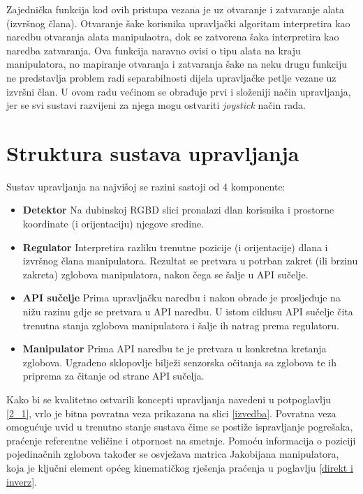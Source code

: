 \documentclass[times, utf8, diplomski, numeric]{fer}
\begin{document}
Zajednička funkcija kod ovih pristupa vezana je uz otvaranje i zatvaranje alata (izvršnog člana).
Otvaranje šake korisnika upravljački algoritam interpretira kao naredbu otvaranja alata manipulaotra, dok se zatvorena šaka interpretira kao naredba zatvaranja.
Ova funkcija naravno ovisi o tipu alata na kraju manipulatora, no mapiranje otvaranja i zatvaranja šake na neku drugu funkciju ne predstavlja problem radi separabilnosti dijela upravljačke petlje vezane uz izvršni član.
U ovom radu većinom se obrađuje prvi i složeniji način upravljanja, jer se svi sustavi razvijeni za njega mogu ostvariti \textit{joystick} način rada.



\section{Struktura sustava upravljanja}
Sustav upravljanja na najvišoj se razini sastoji od 4 komponente:
\begin{itemize}
  \item \textbf{Detektor} Na dubinskoj RGBD slici pronalazi dlan korisnika i prostorne koordinate (i orijentaciju) njegove sredine. 
  \item \textbf{Regulator} Interpretira razliku trenutne pozicije (i orijentacije) dlana i izvršnog člana manipulatora. 
  Rezultat se pretvara u potrban zakret (ili brzinu zakreta) zglobova manipulatora, nakon čega se šalje u API sučelje.
  \item  \textbf{API sučelje} Prima upravljačku naredbu i nakon obrade je prosljeđuje na nižu razinu gdje se pretvara u API naredbu.
  U istom ciklusu API sučelje čita trenutna stanja zglobova manipulatora i šalje ih natrag prema regulatoru.
  \item  \textbf{Manipulator} Prima API naredbu te je pretvara u konkretna kretanja zglobova. 
  Ugrađeno sklopovlje bilježi senzorska očitanja sa zglobova te ih priprema za čitanje od strane API sučelja.
\end{itemize}

Kako bi se kvalitetno ostvarili koncepti upravljanja navedeni u potpoglavlju \ref{2_1}, vrlo je bitna povratna veza prikazana na slici \ref{izvedba}.
Povratna veza omogućuje uvid u trenutno stanje sustava čime se postiže ispravljanje pogrešaka, praćenje referentne veličine i otpornost na smetnje.
Pomoću informacija o poziciji pojedinačnih zglobova također se osvježava matrica Jakobijana manipulatora, koja je ključni element općeg kinematičkog rješenja praćenja u poglavlju \ref{direkt i inverz}.
\end{document}

